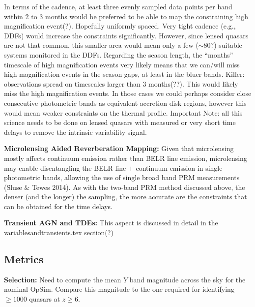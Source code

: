 In terms of the cadence, at least three evenly sampled data points per band within 2 to 3 months would be preferred to be able to map the constraining high magnification event(?). Hopefully uniformly spaced. Very tight cadence (e.g., DDFs) would increase the constraints significantly. However, since lensed quasars are not that common, this smaller area would mean only a few ($\sim80$?) suitable systems monitored in the DDFs.
%
Regarding the season length, the ``months'' timescale of high magnification events very likely means that we can/will miss high magnification events in the season gaps, at least in the bluer bands.
%
Killer: observations spread on timescales larger than 3 months(??). This would likely miss the high magnification events. In those cases we could perhaps consider close consecutive photometric bands as equivalent accretion disk regions, however this would mean weaker constraints on the thermal profile.
%
Important Note: all this science needs to be done on lensed quasars with measured or very short time delays to remove the intrinsic variability signal.

{\bf Microlensing Aided Reverberation Mapping:} Given that microlensing mostly affects continuum emission rather than BELR line emission, microlensing may enable disentangling the BELR line $+$ continuum emission in single photometric bands, allowing the use of single broad band PRM measurements (Sluse \& Tewes 2014). As with the two-band PRM method discussed above, the denser (and the longer) the sampling, the more accurate are the constraints that can be obtained for the time delays.

{\bf Transient AGN and TDEs:} This aspect is discussed in detail in the variablesandtransients.tex section(?)


\subsection{Metrics}
\label{sec:\secname:metrics}


{\bf Selection:} Need to compute the mean $Y$ band magnitude across the sky for the nominal
OpSim. Compare this magnitude to the one required for identifying $\geq1000$ quasars
at $z\geq6$.

